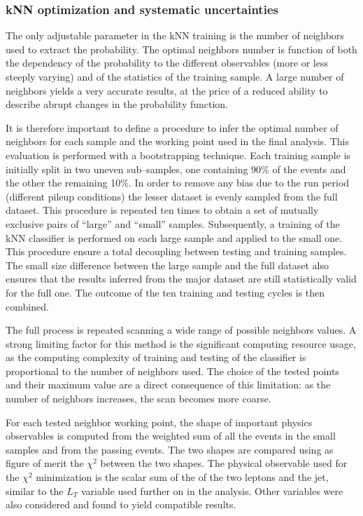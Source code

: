 \subsubsection{kNN optimization and systematic uncertainties}
\label{sec:kNN_uncertainties}

The only adjustable parameter in the kNN training is the number of neighbors used to extract the probability. The optimal neighbors number is function of both the dependency of the probability to the different observables (more or less steeply varying) and of the statistics of the training sample. A large number of neighbors yields a very accurate results, at the price of a reduced ability to describe abrupt changes in the probability function.

It is therefore important to define a procedure to infer the optimal number of neighbors for each sample and the working point used in the final analysis. This evaluation is performed with a bootstrapping technique.
Each training sample is initially split in two uneven sub--samples, one containing 90\% of the events and the other the remaining 10\%. In order to remove any bias due to the run period (different pileup conditions) the lesser dataset is evenly sampled from the full dataset. This procedure is repeated ten times to obtain a set of mutually exclusive pairs of ``large'' and ``small'' samples. Subsequently, a training of the kNN classifier is performed on each large sample and applied to the small one. This procedure ensure a total decoupling between testing and training samples. The small size difference between the large sample and the full dataset also ensures that the results inferred from the major dataset are still statistically valid for the full one. The outcome of the ten training and testing cycles is then combined. 

The full process is repeated scanning a wide range of possible neighbors values. A strong limiting factor for this method is the significant computing resource usage, as the computing complexity of training and testing of the classifier is proportional to the number of neighbors used. The choice of the tested points and their maximum value are a direct consequence of this limitation: as the number of neighbors increases, the scan becomes more coarse.

For each tested neighbor working point, the shape of important physics observables is computed from the weighted sum of all the events in the small samples and from the passing events. The two shapes are compared using as figure of merit the $\chi^2$ between the two shapes. The physical observable used for the $\chi^2$ minimization is the scalar sum of the \pT of the two leptons and the jet, similar to the $L_T$ variable used further on in the analysis. Other variables were also considered and found to yield compatible results. 

